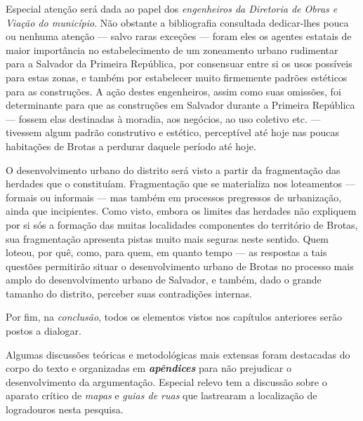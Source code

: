 Especial atenção será dada ao papel dos \textit{engenheiros da Diretoria de Obras e Viação do município}. Não obstante a bibliografia consultada dedicar-lhes pouca ou nenhuma atenção --- salvo raras exceções \cite{almeida_victoria_1997, almeida_vitrinescomercio_2014, cardoso1990proleta, cardoso_vilas_1991} --- foram eles os agentes estatais de maior importância no estabelecimento de um zoneamento urbano rudimentar para a Salvador da Primeira República, por consensuar entre si os usos possíveis para estas zonas, e também por estabelecer muito firmemente padrões estéticos para as construções. A ação destes engenheiros, assim como suas omissões, foi determinante para que as construções em Salvador durante a Primeira República --- fossem elas destinadas à moradia, aos negócios, ao uso coletivo etc. --- tivessem algum padrão construtivo e estético, perceptível até hoje nas poucas habitações de Brotas a perdurar daquele período até hoje.

O desenvolvimento urbano do distrito será visto a partir da fragmentação das herdades que o constituíam. Fragmentação que se materializa nos loteamentos --- formais ou informais --- mas também em processos pregressos de urbanização, ainda que incipientes. Como visto, embora os limites das herdades não expliquem por si sós a formação das muitas localidades componentes do território de Brotas, sua fragmentação apresenta pistas muito mais seguras neste sentido. Quem loteou, por quê, como, para quem, em quanto tempo --- as respostas a tais questões permitirão situar o desenvolvimento urbano de Brotas no processo mais amplo do desenvolvimento urbano de Salvador, e também, dado o grande tamanho do distrito, perceber suas contradições internas.

Por fim, na \textit{conclusão}, todos os elementos vistos nos capítulos anteriores serão postos a dialogar. 

Algumas discussões teóricas e metodológicas mais extensas foram destacadas do corpo do texto e organizadas em \textbf{\textit{apêndices}} para não prejudicar o desenvolvimento da argumentação. Especial relevo tem a discussão sobre o aparato crítico de \textit{mapas} e \textit{guias de ruas} que lastrearam a localização de logradouros nesta pesquisa.


